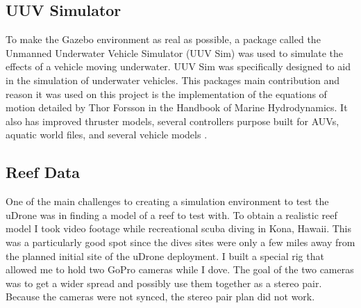 \subsection{UUV Simulator}
To make the Gazebo environment as real as possible, a package called the Unmanned Underwater Vehicle Simulator (UUV Sim) was used to simulate the effects of a vehicle moving underwater. UUV Sim was specifically designed to aid in the simulation of underwater vehicles. This packages main contribution and reason it was used on this project is the implementation of the equations of motion detailed by Thor Forsson in the Handbook of Marine Hydrodynamics. It also has improved thruster models, several controllers purpose built for AUVs, aquatic world files, and several vehicle models \parencite{uuv}. 


\subsection{Reef Data}

One of the main challenges to creating a simulation environment to test the uDrone was in finding a model of a reef to test with. To obtain a realistic reef model I took video footage while recreational scuba diving in Kona, Hawaii. This was a particularly good spot since the dives sites were only a few miles away from the planned initial site of the uDrone deployment. I built a special rig that allowed me to hold two GoPro cameras while I dove. The goal of the two cameras was to get a wider spread and possibly use them together as a stereo pair. Because the cameras were not synced, the stereo pair plan did not work.

